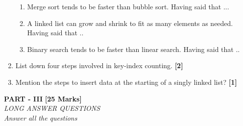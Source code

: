 \documentclass[12pt ,a4paper]{exam}
\begin{document}
\begin{enumerate}[start=1,label={\bfseries Q\arabic*)}]
	    \begin{enumerate}[start=1,label={\bfseries \roman*)}]
	    	\item Merge sort tends to be faster than bubble sort. Having said that ...
	    	\item A linked list can grow and shrink to fit as many elements as needed. Having said that ..
	    	\item Binary search tends to be faster than linear search. Having said that ..
	    \end{enumerate}
      \item List down four steps involved in key-index counting. \hfill \textbf{[2]}
	   \item Mention the steps to insert data at the starting of a singly linked list?  \hfill \textbf{[1]}
	\end{enumerate}
	\pagebreak
	\begin{center}
		\textbf{PART - III} \textbf{[25 Marks]}\\
		\noindent \textit{LONG ANSWER QUESTIONS} \\
		\noindent \textit{Answer all the questions}  
	\end{center}
	
\end{document}
